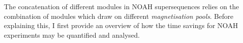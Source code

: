 The concatenation of different modules in NOAH supersequences relies on the combination of modules which draw on different \textit{magnetisation pools}.
Before explaining this, I first provide an overview of how the time savings for NOAH experiments may be quantified and analysed.




